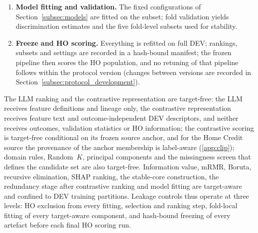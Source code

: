 \documentclass[final,5p,twocolumn]{elsarticle}
\newcommand{\Kfeat}{K}
\begin{document}
\begin{enumerate}
    \item \textbf{Model fitting and validation.} The fixed configurations of Section~\ref{subsec:models} are fitted on the subset; fold validation yields discrimination estimates and the five fold-level subsets used for stability.
    \item \textbf{Freeze and HO scoring.} Everything is refitted on full DEV; rankings, subsets and settings are recorded in a hash-bound manifest; the frozen pipeline then scores the HO population, and no retuning of that pipeline follows within the protocol version (changes between versions are recorded in Section~\ref{subsec:protocol_development}).
\end{enumerate}
The LLM ranking and the contrastive representation are target-free: the LLM receives feature definitions and lineage only, the contrastive representation receives feature text and outcome-independent DEV descriptors, and neither receives outcomes, validation statistics or HO information; the contrastive scoring is target-free conditional on its frozen source anchor, and for the Home Credit source the provenance of the anchor membership is label-aware (\ref{app:clip}); domain rules, Random~$\Kfeat$, principal components and the missingness screen that defines the candidate set are also target-free. Information value, mRMR, Boruta, recursive elimination, SHAP ranking, the stable-core construction, the redundancy stage after contrastive ranking and model fitting are target-aware and confined to DEV training partitions. Leakage controls thus operate at three levels: HO exclusion from every fitting, selection and ranking step, fold-local fitting of every target-aware component, and hash-bound freezing of every artefact before each final HO scoring run.
\end{document}
